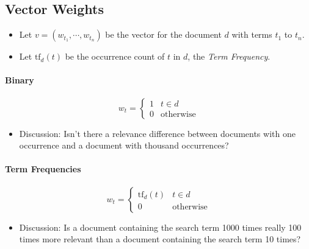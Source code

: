 \documentclass[a4paper, 11pt, accentcolor = tud3b]{tudreport}
\begin{document}
            \subsection{Vector Weights} %
            	\begin{itemize}
            		\item Let \( v = (w_{t_1}, \cdots, w_{t_n}) \) be the vector for the document \( d \) with terms \( t_1 \) to \( t_n \).
            		\item Let \( \text{tf}_d(t) \) be the occurrence count of \(t\) in \(d\), the \textit{Term Frequency}.
            	\end{itemize}

                \paragraph{Binary} %
                    \begin{equation*}
	                    w_t =
	                    	\begin{cases}
		                    	1 & t \in d \\
		                    	0 & \text{otherwise}
	                    	\end{cases}
                    \end{equation*}
                    
                    \begin{itemize}
                    	\item Discussion: Isn't there a relevance difference between documents with one occurrence and a document with thousand occurrences?
                    \end{itemize}

                \paragraph{Term Frequencies} %
                    \begin{equation*}
	                    w_t =
	                    	\begin{cases}
		                    	\text{tf}_d(t) & t \in d \\
		                    	0 & \text{otherwise}
	                    	\end{cases}
                    \end{equation*}
                    
                    \begin{itemize}
                    	\item Discussion: Is a document containing the search term 1000 times really 100 times more relevant than a document containing the search term 10 times?
                    \end{itemize}
\end{document}
